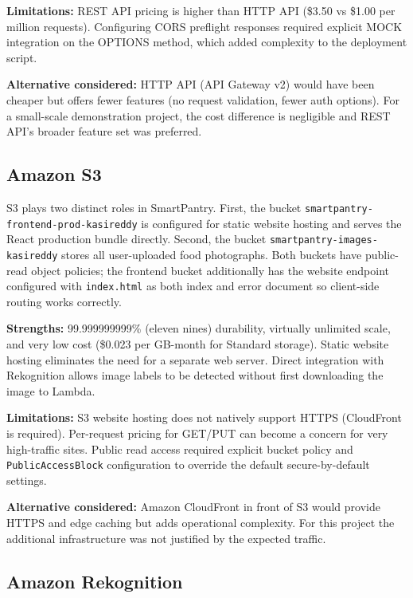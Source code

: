\documentclass[conference]{IEEEtran}
\begin{document}
\textbf{Limitations:} REST API pricing is higher than HTTP API (\$3.50 vs \$1.00 per million requests). Configuring CORS preflight responses required explicit MOCK integration on the OPTIONS method, which added complexity to the deployment script.

\textbf{Alternative considered:} HTTP API (API Gateway v2) would have been cheaper but offers fewer features (no request validation, fewer auth options). For a small-scale demonstration project, the cost difference is negligible and REST API's broader feature set was preferred.

\subsection{Amazon S3}

S3 plays two distinct roles in SmartPantry. First, the bucket \texttt{smartpantry-frontend-prod-kasireddy} is configured for static website hosting and serves the React production bundle directly. Second, the bucket \texttt{smartpantry-images-kasireddy} stores all user-uploaded food photographs. Both buckets have public-read object policies; the frontend bucket additionally has the website endpoint configured with \texttt{index.html} as both index and error document so client-side routing works correctly.

\textbf{Strengths:} 99.999999999\% (eleven nines) durability, virtually unlimited scale, and very low cost (\$0.023 per GB-month for Standard storage). Static website hosting eliminates the need for a separate web server. Direct integration with Rekognition allows image labels to be detected without first downloading the image to Lambda.

\textbf{Limitations:} S3 website hosting does not natively support HTTPS (CloudFront is required). Per-request pricing for GET/PUT can become a concern for very high-traffic sites. Public read access required explicit bucket policy and \texttt{PublicAccessBlock} configuration to override the default secure-by-default settings.

\textbf{Alternative considered:} Amazon CloudFront in front of S3 would provide HTTPS and edge caching but adds operational complexity. For this project the additional infrastructure was not justified by the expected traffic.

\subsection{Amazon Rekognition}
\end{document}
